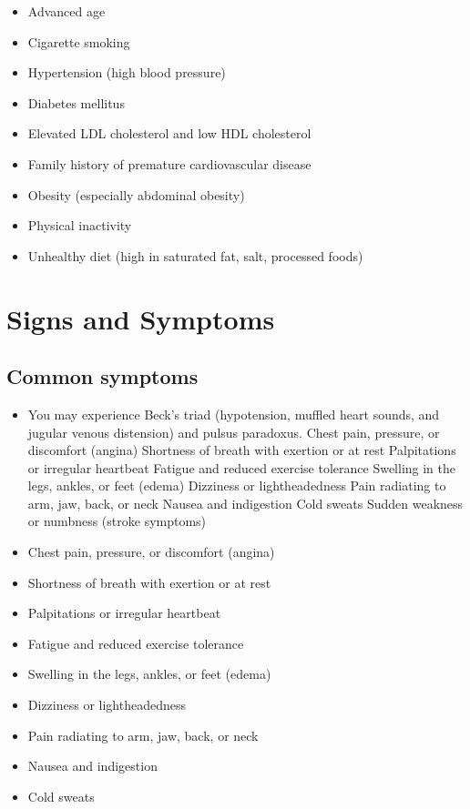 \begin{itemize}[noitemsep]
  \item Advanced age
  \item Cigarette smoking
  \item Hypertension (high blood pressure)
  \item Diabetes mellitus
  \item Elevated LDL cholesterol and low HDL cholesterol
  \item Family history of premature cardiovascular disease
  \item Obesity (especially abdominal obesity)
  \item Physical inactivity
  \item Unhealthy diet (high in saturated fat, salt, processed foods)
\end{itemize}
\section{Signs and Symptoms}

\subsection{Common symptoms}
\begin{itemize}[noitemsep]
  \item You may experience Beck's triad (hypotension, muffled heart sounds, and jugular venous distension) and pulsus paradoxus. Chest pain, pressure, or discomfort (angina) Shortness of breath with exertion or at rest Palpitations or irregular heartbeat Fatigue and reduced exercise tolerance Swelling in the legs, ankles, or feet (edema) Dizziness or lightheadedness Pain radiating to arm, jaw, back, or neck Nausea and indigestion Cold sweats Sudden weakness or numbness (stroke symptoms)
  \item Chest pain, pressure, or discomfort (angina)
  \item Shortness of breath with exertion or at rest
  \item Palpitations or irregular heartbeat
  \item Fatigue and reduced exercise tolerance
  \item Swelling in the legs, ankles, or feet (edema)
  \item Dizziness or lightheadedness
  \item Pain radiating to arm, jaw, back, or neck
  \item Nausea and indigestion
  \item Cold sweats
\end{itemize}


